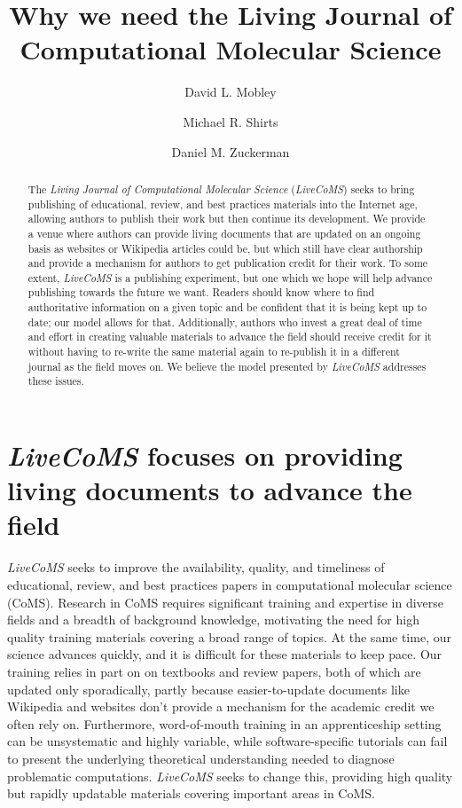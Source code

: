 \documentclass[9pt]{livecoms}
\title{Why we need the Living Journal of Computational Molecular Science}
\author[1*]{David L. Mobley}
\author[2*]{Michael R. Shirts}
\author[3*]{Daniel M. Zuckerman}
\affil[1]{Department of Pharmaceutical Sciences and Chemistry, University of California, Irvine}
\affil[2]{Department of Chemical and Biological Engineering, University of Colorado Boulder}
\affil[2]{Department of Biomedical Engineering, Oregon Health Sciences University}
\begin{document}
\maketitle

\begin{abstract}
The \emph{Living Journal of Computational Molecular Science} (\emph{LiveCoMS}) seeks to bring publishing of educational, review, and best practices materials into the Internet age, allowing authors to publish their work but then continue its development.
We provide a venue where authors can provide living documents that are updated on an ongoing basis as websites or Wikipedia articles could be, but which still have clear authorship and provide a mechanism for authors to get publication credit for their work.
To some extent, \emph{LiveCoMS} is a publishing experiment, but one which we hope will help advance publishing towards the future we want.
Readers should know where to find authoritative information on a given topic and be confident that it is being kept up to date; our model allows for that. 
Additionally, authors who invest a great deal of time and effort in creating valuable materials to advance the field should receive credit for it without having to re-write the same material again to re-publish it in a different journal as the field moves on. 
We believe the model presented by \emph{LiveCoMS} addresses these issues.
\end{abstract}


\section{\emph{LiveCoMS} focuses on providing living documents to advance the field}

\emph{LiveCoMS} seeks to improve the availability, quality, and timeliness of educational, review, and best practices papers in computational molecular science (CoMS).
Research in CoMS requires significant training and expertise in diverse fields and a breadth of background knowledge, motivating the need for high quality training materials covering a broad range of topics.
At the same time, our science advances quickly, and it is difficult for these materials to keep pace. 
Our training relies in part on on textbooks and review papers, both of which are updated only sporadically, partly because easier-to-update documents like Wikipedia and websites don't provide a mechanism for the academic credit we often rely on.
Furthermore, word-of-mouth training in an apprenticeship setting can be unsystematic and highly variable, while software-specific tutorials can fail to present the underlying theoretical understanding needed to diagnose problematic computations.
\emph{LiveCoMS} seeks to change this, providing high quality but rapidly updatable materials covering important areas in CoMS.
\end{document}
